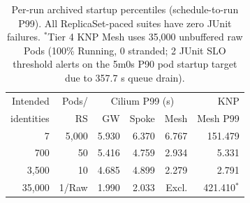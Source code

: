 \documentclass[letterpaper,twocolumn,10pt]{article}
\newcommand{\sys}{\textsc{KNP}}
\begin{document}
\begin{table}[t]
\centering
\small
\setlength{\tabcolsep}{2.5pt}
\begin{tabular}{rrrrrr}
\toprule
Intended & Pods/ & \multicolumn{3}{c}{Cilium P99 (s)} & \sys{}\\
identities & RS & GW & Spoke & Mesh & Mesh P99\\
\midrule
7 & 5,000 & 5.930 & 6.370 & 6.767 & 151.479\\
700 & 50 & 5.416 & 4.759 & 2.934 & 5.331\\
3,500 & 10 & 4.685 & 4.899 & 2.279 & 2.791\\
35,000 & 1/Raw & 1.990 & 2.033 & Excl. & 421.410$^{*}$\\
\bottomrule
\end{tabular}
\caption{Per-run archived startup percentiles (schedule-to-run P99). All
ReplicaSet-paced suites have zero JUnit failures. $^{*}$Tier 4 \sys{} Mesh
uses 35,000 unbuffered raw Pods (100\% Running, 0 stranded; 2 JUnit SLO
threshold alerts on the 5m0s P90 pod startup target due to 357.7 s queue drain).}
\label{tab:identity}
\end{table}
\end{document}
